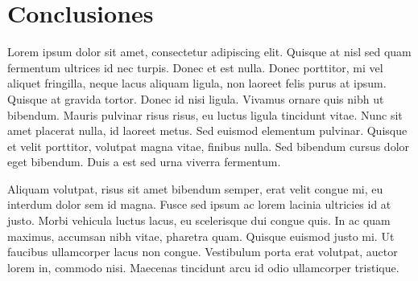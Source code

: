 \section{Conclusiones}
Lorem ipsum dolor sit amet, consectetur adipiscing elit. Quisque at nisl sed quam fermentum ultrices id nec turpis. Donec et est nulla. Donec porttitor, mi vel aliquet fringilla, neque lacus aliquam ligula, non laoreet felis purus at ipsum. Quisque at gravida tortor. Donec id nisi ligula. Vivamus ornare quis nibh ut bibendum. Mauris pulvinar risus risus, eu luctus ligula tincidunt vitae. Nunc sit amet placerat nulla, id laoreet metus. Sed euismod elementum pulvinar. Quisque et velit porttitor, volutpat magna vitae, finibus nulla. Sed bibendum cursus dolor eget bibendum. Duis a est sed urna viverra fermentum.

Aliquam volutpat, risus sit amet bibendum semper, erat velit congue mi, eu interdum dolor sem id magna. Fusce sed ipsum ac lorem lacinia ultricies id at justo. Morbi vehicula luctus lacus, eu scelerisque dui congue quis. In ac quam maximus, accumsan nibh vitae, pharetra quam. Quisque euismod justo mi. Ut faucibus ullamcorper lacus non congue. Vestibulum porta erat volutpat, auctor lorem in, commodo nisi. Maecenas tincidunt arcu id odio ullamcorper tristique.